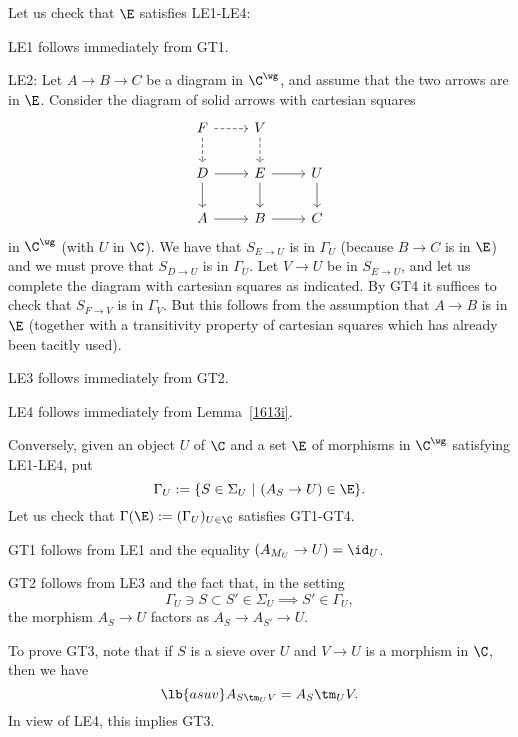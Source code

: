 \documentclass[12pt]{article}
\theoremstyle{remark}
\theoremstyle{definition}
\begin{document}
Let us check that $\E$ satisfies LE1-LE4:

\nn LE1 follows immediately from GT1.

\nn LE2: Let $A\to B\to C$ be a diagram in $\C^\wg$, and assume that the two arrows are in $\E$. Consider the diagram of solid arrows with cartesian squares 
$$
\begin{tikzcd}
F\ar[dashed]{r}\ar[dashed]{d}&V\ar[dashed]{d}\\ 
D\ar{r}\ar{d}&E\ar{r}\ar{d}&U\ar{d}\\ 
A\ar{r}&B\ar{r}&C
\end{tikzcd}
$$
in $\C^\wg$ (with $U$ in $\C$). We have that $S_{E\to U}$ is in $\Gamma_U$ (because $B\to C$ is in $\E$) and we must prove that $S_{D\to U}$ is in $\Gamma_U$. Let $V\to U$ be in $S_{E\to U}$, and let us complete the diagram with cartesian squares as indicated. By GT4 it suffices to check that $S_{F\to V}$ is in $\Gamma_V$. But this follows from the assumption that $A\to B$ is in $\E$ (together with a transitivity property of cartesian squares which has already been tacitly used).

\nn LE3 follows immediately from GT2.

\nn LE4 follows immediately from Lemma~\ref{1613i}. %

Conversely, given an object $U$ of $\C$ and a set $\E$ of morphisms in $\C^\wg$ satisfying LE1-LE4, put
$$
\Gamma_U:=\{S\in\Sigma_U\ |\ (A_S\to U)\in\E\}.
$$
Let us check that $\Gamma(\E):=(\Gamma_U)_{U\in\C}$ satisfies GT1-GT4.

GT1 follows from LE1 and the equality $(A_{M_U}\to U)=\id_U$. 

GT2 follows from LE3 and the fact that, in the setting 
$$
\Gamma_U\ni S\subset S'\in\Sigma_U\implies S'\in\Gamma_U,
$$ 
the morphism $A_S\to U$ factors as $A_S\to A_{S'}\to U$. 

To prove GT3, note that if $S$ is a sieve over $U$ and $V\to U$ is a morphism in $\C$, then we have 
%
\begin{equation}\lb{asuv}
A_{S\tm_UV}=A_S\tm_UV.
\end{equation}
%
In view of LE4, this implies GT3.  
\end{document}
